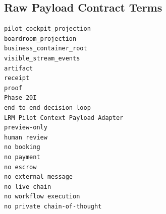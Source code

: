 \subsection{Raw Payload Contract Terms}

\begin{verbatim}
pilot_cockpit_projection
boardroom_projection
business_container_root
visible_stream_events
artifact
receipt
proof
Phase 20I
end-to-end decision loop
LRM Pilot Context Payload Adapter
preview-only
human review
no booking
no payment
no escrow
no external message
no live chain
no workflow execution
no private chain-of-thought
\end{verbatim}
